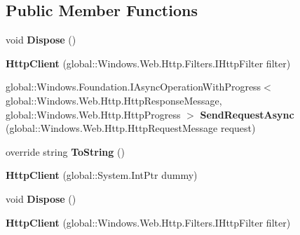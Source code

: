 \subsection*{Public Member Functions}
\begin{DoxyCompactItemize}
\item 
\mbox{\label{class_windows_1_1_web_1_1_http_1_1_http_client_aab5624a2c68e0b7e0a4fc8ae1ad2e18a}} 
void {\bfseries Dispose} ()
\item 
\mbox{\label{class_windows_1_1_web_1_1_http_1_1_http_client_a3031f91618b3dbcdb1053a2566067297}} 
{\bfseries Http\+Client} (global\+::\+Windows.\+Web.\+Http.\+Filters.\+I\+Http\+Filter filter)
\item 
\mbox{\label{class_windows_1_1_web_1_1_http_1_1_http_client_ad31279b417a187b8f8f2ec9bfc0149f9}} 
global\+::\+Windows.\+Foundation.\+I\+Async\+Operation\+With\+Progress$<$ global\+::\+Windows.\+Web.\+Http.\+Http\+Response\+Message, global\+::\+Windows.\+Web.\+Http.\+Http\+Progress $>$ {\bfseries Send\+Request\+Async} (global\+::\+Windows.\+Web.\+Http.\+Http\+Request\+Message request)
\item 
\mbox{\label{class_windows_1_1_web_1_1_http_1_1_http_client_a649e21fae58b67e6dcf87c4f4c7fd711}} 
override string {\bfseries To\+String} ()
\item 
\mbox{\label{class_windows_1_1_web_1_1_http_1_1_http_client_a375894a36751ce007d8632850ca5b413}} 
{\bfseries Http\+Client} (global\+::\+System.\+Int\+Ptr dummy)
\item 
\mbox{\label{class_windows_1_1_web_1_1_http_1_1_http_client_aab5624a2c68e0b7e0a4fc8ae1ad2e18a}} 
void {\bfseries Dispose} ()
\item 
\mbox{\label{class_windows_1_1_web_1_1_http_1_1_http_client_a3031f91618b3dbcdb1053a2566067297}} 
{\bfseries Http\+Client} (global\+::\+Windows.\+Web.\+Http.\+Filters.\+I\+Http\+Filter filter)
\item 

\end{DoxyCompactItemize}
